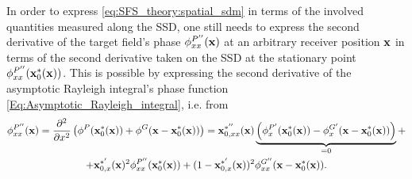 \vspace{3mm}
In order to express \eqref{eq:SFS_theory:spatial_sdm} in terms of the involved quantities measured along the SSD, one still needs to express the second derivative of the target field's phase $\phi^{P''}_{xx}(\mathbf{x})$ at an arbitrary receiver position $\mathbf{x}$ in terms of the second derivative taken on the SSD at the stationary point $\phi^{P''}_{xx}(\mathbf{x}_0^*(\mathbf{x}))$.
This is possible by expressing the second derivative of the asymptotic Rayleigh integral's phase function \eqref{Eq:Asymptotic_Rayleigh_integral}, i.e. from
\begin{multline}
\phi^{P''}_{xx}(\mathbf{x}) = \frac{\partial^2}{\partial x^2} \left( \phi^P(\mathbf{x}_0^*(\mathbf{x})) + \phi^G(\mathbf{x} - \mathbf{x}_0^*(\mathbf{x})) \right) = 
\mathbf{x}^{*''}_{0,xx}(\mathbf{x})  \underbrace{\left( \phi^{P'}_x(\mathbf{x}_0^*(\mathbf{x})) - \phi^{G'}_x(\mathbf{x} - \mathbf{x}_0^*(\mathbf{x})) \right)}_{ = 0} + \\
 + \mathbf{x}^{*'}_{0,x}(\mathbf{x})^2 \phi^{P''}_{xx}(\mathbf{x}_0^*(\mathbf{x}))
 + (1 - \mathbf{x}^{*'}_{0,x}(\mathbf{x}))^2\phi^{G''}_{xx}(\mathbf{x} - \mathbf{x}_0^*(\mathbf{x})).
\end{multline}

